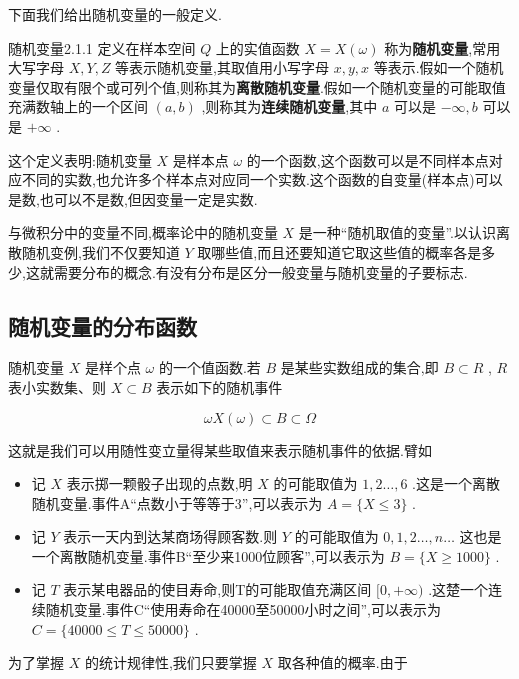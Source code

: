 下面我们给出随机变量的一般定义.

\begin{definition}{随机变量}{2.1.1}
	定义在样本空间 $ Q $ 上的实值函数 $ X=X(\omega) $ 称为\textbf{随机变量},常用大写字母 $ X,Y,Z $ 等表示随机变量,其取值用小写字母 $ x,y,x $ 等表示.假如一个随机变量仅取有限个或可列个值,则称其为\textbf{离散随机变量}.假如一个随机变量的可能取值充满数轴上的一个区间 $ (a,b) $ ,则称其为\textbf{连续随机变量},其中 $ a $ 可以是 $ -\infty ,b $ 可以是 $ +\infty $ .
\end{definition}


这个定义表明:随机变量 $ X $ 是样本点 $ \omega $ 的一个函数,这个函数可以是不同样本点对应不同的实数,也允许多个样本点对应同一个实数.这个函数的自变量(样本点)可以是数,也可以不是数,但因变量一定是实数.

与微积分中的变量不同,概率论中的随机变量 $ X $ 是一种“随机取值的变量”.以认识离散随机变例,我们不仅要知道 $ Y $ 取哪些值,而且还要知道它取这些值的概率各是多少,这就需要分布的概念.有没有分布是区分一般变量与随机变量的子要标志.

\subsection{随机变量的分布函数}\label{ssec:2.1.2}

随机变量 $ X $ 是样个点 $ \omega $ 的一个值函数.若 $ B $ 是某些实数组成的集合,即 $ B\subset R $ , $ R $ 表小实数集、则 $ X\subset B $ 表示如下的随机事件

\[
\omega X(\omega)\subset B \subset \Omega
\]

这就是我们可以用随性变立量得某些取值来表示随机事件的依据.臂如

\begin{itemize}
	\item 记 $ X $ 表示掷一颗骰子出现的点数,明 $ X $ 的可能取值为 $ 1,2\dotsc ,6 $ .这是一个离散随机变量.事件A“点数小于等等于3”,可以表示为 $ A=\{X\leq 3\} $ .
	\item 记 $ Y $ 表示一天内到达某商场得顾客数.则 $ Y $ 的可能取值为 $ 0,1,2\dotsc ,n\dotsc $ 这也是一个离散随机变量.事件B“至少来1000位顾客”,可以表示为 $ B=\{ X\geq 1000 \} $ .
	\item 记 $ T $ 表示某电器品的使目寿命,则T的可能取值充满区间 $ [0,+\infty ) $ .这楚一个连续随机变量.事件C“使用寿命在40000至50000小时之间”,可以表示为 $ C=\{ 40000 \leq T \leq 50000 \} $ . 
\end{itemize}

为了掌握 $ X $ 的统计规律性,我们只要掌握 $ X $ 取各种值的概率.由于

